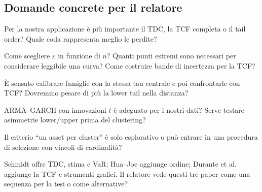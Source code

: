 \documentclass[11pt,a4paper]{article}
\begin{document}
\subsection*{Domande concrete per il relatore}
\begin{description}[leftmargin=3.2cm,style=nextline]
  \item[Concettuali] Per la nostra applicazione è più importante il TDC, la
  TCF completa o il tail order? Quale coda rappresenta meglio le perdite?
  \item[Stima] Come scegliere $\varepsilon$ in funzione di $n$? Quanti punti
  estremi sono necessari per considerare leggibile una curva? Come costruire
  bande di incertezza per la TCF?
  \item[Copule] È sensato calibrare famiglie con la stessa tau centrale e poi
  confrontarle con TCF? Dovremmo pesare di più la lower tail nella distanza?
  \item[Serie finanziarie] ARMA--GARCH con innovazioni $t$ è adeguato per i
  nostri dati? Serve testare asimmetrie lower/upper prima del clustering?
  \item[Portafoglio] Il criterio ``un asset per cluster'' è solo esplorativo o
  può entrare in una procedura di selezione con vincoli di cardinalità?
  \item[Collegamento] Schmidt offre TDC, stima e VaR; Hua--Joe aggiunge ordine;
  Durante et al. aggiunge la TCF e strumenti grafici. Il relatore vede questi
  tre paper come una sequenza per la tesi o come alternative?
\end{description}
\end{document}

